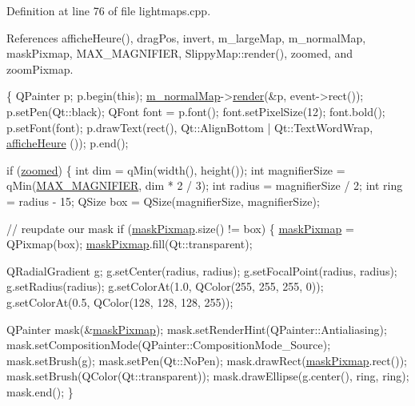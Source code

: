 Definition at line 76 of file lightmaps.\-cpp.



References affiche\-Heure(), drag\-Pos, invert, m\-\_\-large\-Map, m\-\_\-normal\-Map, mask\-Pixmap, M\-A\-X\-\_\-\-M\-A\-G\-N\-I\-F\-I\-E\-R, Slippy\-Map\-::render(), zoomed, and zoom\-Pixmap.


\begin{DoxyCode}
\{
    QPainter p;
    p.begin(\textcolor{keyword}{this});
    \hyperlink{classLightMaps_a62539ec15fdc3559461cfa5b80ed3f84}{m\_normalMap}->\hyperlink{classSlippyMap_ada1e00e2870d0fdeb70c037b3222a0ad}{render}(&p, event->rect());
    p.setPen(Qt::black);
    QFont font = p.font();
    font.setPixelSize(12);
    font.bold();
    p.setFont(font);
    p.drawText(rect(),  Qt::AlignBottom | Qt::TextWordWrap, \hyperlink{classLightMaps_a4ba4104b6f73f5887227075c38ae8a7c}{afficheHeure}
      ());
    p.end();

    \textcolor{keywordflow}{if} (\hyperlink{classLightMaps_a3ecc8b8c64dfe20dd5bdfc7974ac48e3}{zoomed}) \{
        \textcolor{keywordtype}{int} dim = qMin(width(), height());
        \textcolor{keywordtype}{int} magnifierSize = qMin(\hyperlink{lightmaps_8cpp_a51ac6ea721e00a4f2396493f9517b9e5}{MAX\_MAGNIFIER}, dim * 2 / 3);
        \textcolor{keywordtype}{int} radius = magnifierSize / 2;
        \textcolor{keywordtype}{int} ring = radius - 15;
        QSize box = QSize(magnifierSize, magnifierSize);

        \textcolor{comment}{// reupdate our mask}
        \textcolor{keywordflow}{if} (\hyperlink{classLightMaps_a3a24ed88ec215d755ab8a2255b61ebf0}{maskPixmap}.size() != box) \{
            \hyperlink{classLightMaps_a3a24ed88ec215d755ab8a2255b61ebf0}{maskPixmap} = QPixmap(box);
            \hyperlink{classLightMaps_a3a24ed88ec215d755ab8a2255b61ebf0}{maskPixmap}.fill(Qt::transparent);

            QRadialGradient g;
            g.setCenter(radius, radius);
            g.setFocalPoint(radius, radius);
            g.setRadius(radius);
            g.setColorAt(1.0, QColor(255, 255, 255, 0));
            g.setColorAt(0.5, QColor(128, 128, 128, 255));

            QPainter mask(&\hyperlink{classLightMaps_a3a24ed88ec215d755ab8a2255b61ebf0}{maskPixmap});
            mask.setRenderHint(QPainter::Antialiasing);
            mask.setCompositionMode(QPainter::CompositionMode\_Source);
            mask.setBrush(g);
            mask.setPen(Qt::NoPen);
            mask.drawRect(\hyperlink{classLightMaps_a3a24ed88ec215d755ab8a2255b61ebf0}{maskPixmap}.rect());
            mask.setBrush(QColor(Qt::transparent));
            mask.drawEllipse(g.center(), ring, ring);
            mask.end();
        \}


\end{DoxyCode}
